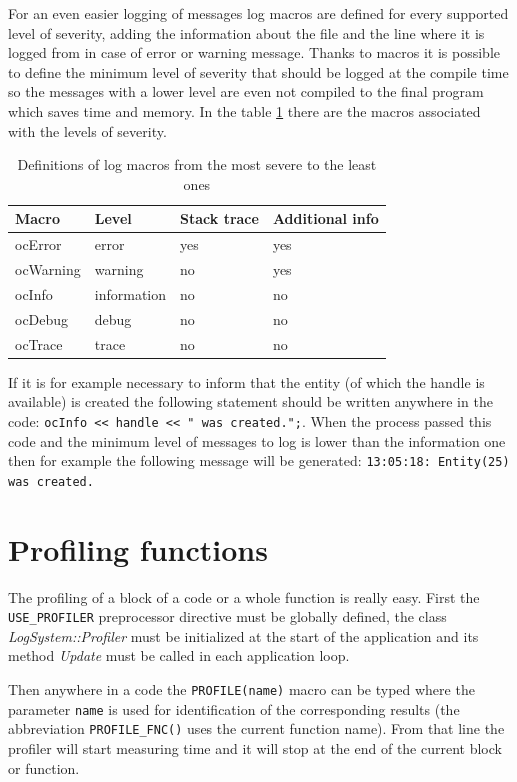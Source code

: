 \documentclass[a4paper, 12pt]{report}
\begin{document}
For an even easier logging of messages log macros are defined for every supported level of severity, adding the information about the file and the line where it is logged from in case of error or warning message. Thanks to macros it is possible to define the minimum level of severity that should be logged at the compile time so the messages with a lower level are even not compiled to the final program which saves time and memory. In the table \ref{tab:log-macros} there are the macros associated with the levels of severity.

\begin{table}[htbp]
	\centering
		\begin{tabular}{|l|l|l|l|}
			\hline
			Macro & Level & Stack trace & Additional info \\
			\hline
			ocError & error & yes & yes \\
			ocWarning & warning & no & yes \\
			ocInfo & information & no & no \\
			ocDebug & debug & no & no \\
			ocTrace & trace & no & no \\
			\hline
		\end{tabular}
	\caption[Definitions of log macros]{Definitions of log macros from the most severe to the least ones}
	\label{tab:log-macros}
\end{table}

If it is for example necessary to inform that the entity (of which the handle is available) is created the following statement should be written anywhere in the code: \verb/ocInfo << handle << " was created.";/. When the process passed this code and the minimum level of messages to log is lower than the information one then for example the following message will be generated: \verb/13:05:18: Entity(25) was created./

\section{Profiling functions}
\label{sec:profiling}

The profiling of a block of a code or a whole function is really easy. First the \verb/USE_PROFILER/ preprocessor directive must be globally defined, the class \emph{LogSystem::Profiler} must be initialized at the start of the application and its method \emph{Update} must be called in each application loop.

Then anywhere in a code the \verb/PROFILE(name)/ macro can be typed where the parameter \verb/name/ is used for identification of the corresponding results (the abbreviation \verb/PROFILE_FNC()/ uses the current function name). From that line the profiler will start measuring time and it will stop at the end of the current block or function.
\end{document}
